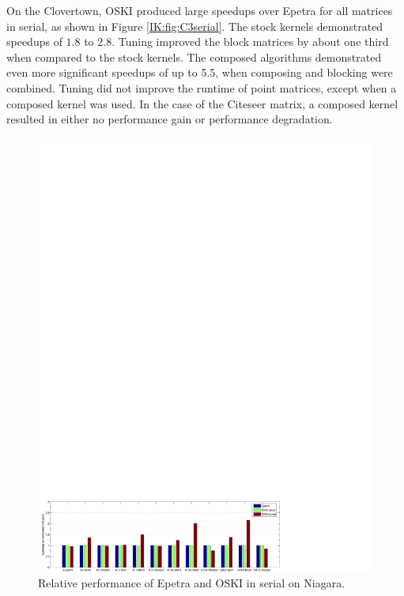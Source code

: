 On the Clovertown, OSKI produced large speedups over Epetra for all matrices in serial,
as shown in Figure \ref{IK:fig:C3serial}.
The stock kernels demonstrated speedups of $1.8$ to $2.8$.  Tuning improved the block matrices by about one third 
when compared to the stock kernels. The composed algorithms demonstrated even more significant speedups of up to
5.5, when composing and blocking were combined.
Tuning did not improve the runtime of point matrices, except when a composed
kernel was used.  In the
case of the Citeseer matrix, a composed kernel resulted in either no performance gain or performance 
degradation.



\begin{figure}[htbp]
\begin{center}
\includegraphics[scale=.8]{./plots/hypnotoadserial.pdf}
\caption{Relative performance of Epetra and OSKI in serial on Niagara.}
\label{IK:fig:hypnotoadserial}
\end{center}
\end{figure}

